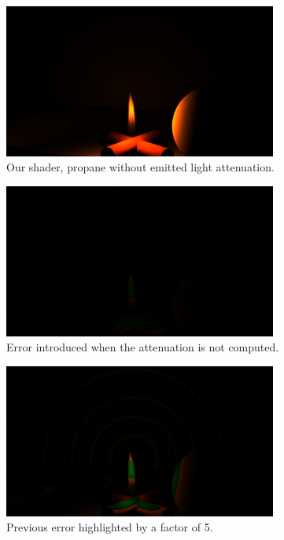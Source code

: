 \begin{figure}[htbp]
	\centering
	\includegraphics[width=0.8\textwidth, trim={8cm 0 8cm 10cm}, clip]{img/result_propane}
	\caption{Our shader, propane without emitted light attenuation.}
	\label{fig:result_propane}
\end{figure}

\begin{figure}[htbp]
	\centering
	\includegraphics[width=0.8\textwidth, trim={8cm 0 8cm 10cm}, clip]{img/result_diff_shadow}
	\caption{Error introduced when the attenuation is not computed.}
	\label{fig:result_diff_shadow}
\end{figure}

\begin{figure}[htbp]
	\centering
	\includegraphics[width=0.8\textwidth, trim={8cm 0 8cm 10cm}, clip]{img/result_diff_shadow_x5}
	\caption{Previous error highlighted by a factor of 5.}
	\label{fig:result_diff_shadow_x5}
\end{figure}

